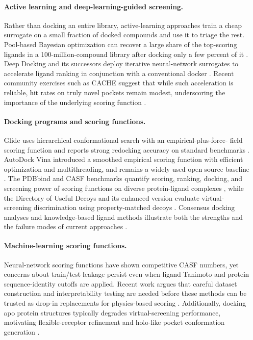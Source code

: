 \paragraph{Active learning and deep-learning-guided screening.}
Rather than docking an entire library, active-learning approaches train a
cheap surrogate on a small fraction of docked compounds and use it to triage
the rest. Pool-based Bayesian optimization can recover a large share of the
top-scoring ligands in a 100-million-compound library after docking only a
few percent of it \citep{graff2021accelerating}. Deep Docking and its
successors deploy iterative neural-network surrogates to accelerate ligand
ranking in conjunction with a conventional docker
\citep{gentile2022deepdocking,yaacoub2022ddgui}. Recent community exercises
such as CACHE suggest that while such acceleration is reliable, hit rates on
truly novel pockets remain modest, underscoring the importance of the
underlying scoring function \citep{li2024cache}.

\paragraph{Docking programs and scoring functions.}
Glide uses hierarchical conformational search with an empirical-plus-force-
field scoring function and reports strong redocking accuracy on standard
benchmarks \citep{friesner2004glide}. AutoDock Vina introduced a smoothed
empirical scoring function with efficient optimization and multithreading,
and remains a widely used open-source baseline \citep{trott2010vina}. The
PDBbind and CASF benchmarks quantify scoring, ranking, docking, and
screening power of scoring functions on diverse protein-ligand complexes
\citep{liu2017pdbbind,su2019casf2016}, while the Directory of Useful Decoys
and its enhanced version evaluate virtual-screening discrimination using
property-matched decoys \citep{mysinger2012dude}. Consensus docking analyses
and knowledge-based ligand methods illustrate both the strengths and the
failure modes of current approaches \citep{chaput2017usc,ebejer2019ligity}.

\paragraph{Machine-learning scoring functions.}
Neural-network scoring functions have shown competitive CASF numbers, yet
concerns about train/test leakage persist even when ligand Tanimoto and
protein sequence-identity cutoffs are applied. Recent work argues that
careful dataset construction and interpretability testing are needed before
these methods can be trusted as drop-in replacements for physics-based
scoring \citep{scantlebury2023pointvs}. Additionally, docking apo protein
structures typically degrades virtual-screening performance, motivating
flexible-receptor refinement and holo-like pocket conformation generation
\citep{guterres2020apo}.

